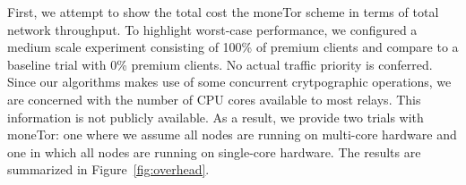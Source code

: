 First, we attempt to show the total cost the moneTor scheme in terms of total
network throughput. To highlight worst-case performance, we configured a medium
scale experiment consisting of 100\% of premium clients and compare to a
baseline trial with 0\% premium clients. No actual traffic priority is
conferred. Since our algorithms makes use of some concurrent crytpographic
operations, we are concerned with the number of CPU cores available to most
relays. This information is not publicly available. As a result, we 
provide two trials with moneTor: one where we assume all nodes are running on
multi-core hardware and one in which all nodes are running on single-core
hardware. The results are summarized in Figure~\ref{fig:overhead}.


